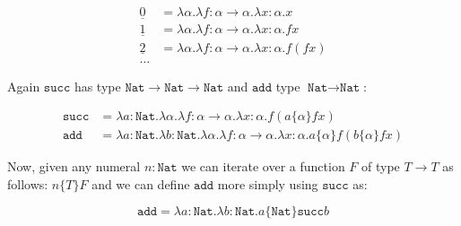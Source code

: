\documentclass{article}
\newcommand{\Nat}{\texttt{Nat}}
\newcommand{\rarr}{\rightarrow}
\begin{document}
\begin{align*}
    \underline{0} &= \lambda \alpha . \lambda f: \alpha \rarr \alpha . \lambda x: \alpha .x  \\
    \underline{1} &= \lambda \alpha . \lambda f: \alpha \rarr \alpha . \lambda x: \alpha . f x  \\
    \underline{2} &= \lambda \alpha . \lambda f: \alpha \rarr \alpha . \lambda x: \alpha . f(f x ) \\
    \dots
\end{align*}

Again $ \texttt{succ}$ has type $ \Nat \rarr \Nat \rarr \Nat$ and $ \texttt{add}$ type $\Nat \rarr \Nat$:

\begin{align}
    \texttt{succ} &= \lambda a: \Nat. \lambda \alpha . \lambda f: \alpha \rarr \alpha. \lambda x: \alpha .f (a \{ \alpha  \} f x) \\
    \texttt{add} &= \lambda a: \Nat . \lambda b: \Nat . \lambda \alpha . \lambda f : \alpha \rarr \alpha . \lambda x: \alpha . a \{ \alpha  \} f ( b \{ \alpha  \} f x )
\end{align}

Now, given any numeral $n : \Nat$ we can iterate over a function $F$ of type $ T\rarr T$ as follows: $n \{ T \} F$ and we can define $ \texttt{add}$ more simply using $ \texttt{succ}$ as:

$$
\texttt{add} = \lambda a: \Nat. \lambda b: \Nat. a \{ \Nat \} \texttt{succ} b
$$
\end{document}
